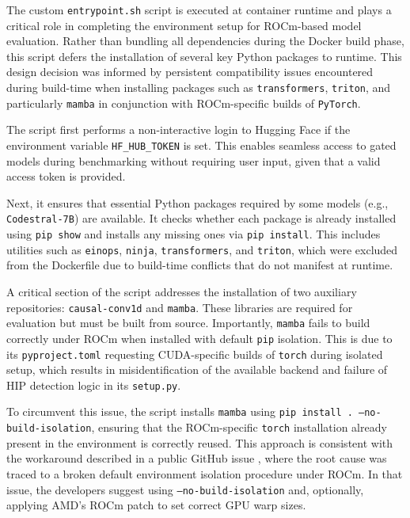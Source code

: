The custom \texttt{entrypoint.sh} script is executed at container runtime and plays a critical role in completing the environment setup for ROCm-based model evaluation. Rather than bundling all dependencies during the Docker build phase, this script defers the installation of several key Python packages to runtime. This design decision was informed by persistent compatibility issues encountered during build-time when installing packages such as \texttt{transformers}, \texttt{triton}, and particularly \texttt{mamba} in conjunction with ROCm-specific builds of \texttt{PyTorch}.

The script first performs a non-interactive login to Hugging Face if the environment variable \texttt{HF\_HUB\_TOKEN} is set. This enables seamless access to gated models during benchmarking without requiring user input, given that a valid access token is provided.

Next, it ensures that essential Python packages required by some models (e.g., \texttt{Codestral-7B}) are available. It checks whether each package is already installed using \texttt{pip show} and installs any missing ones via \texttt{pip install}. This includes utilities such as \texttt{einops}, \texttt{ninja}, \texttt{transformers}, and \texttt{triton}, which were excluded from the Dockerfile due to build-time conflicts that do not manifest at runtime.

A critical section of the script addresses the installation of two auxiliary repositories: \texttt{causal-conv1d} and \texttt{mamba}. These libraries are required for evaluation but must be built from source. Importantly, \texttt{mamba} fails to build correctly under ROCm when installed with default \texttt{pip} isolation. This is due to its \texttt{pyproject.toml} requesting CUDA-specific builds of \texttt{torch} during isolated setup, which results in misidentification of the available backend and failure of HIP detection logic in its \texttt{setup.py}.

To circumvent this issue, the script installs \texttt{mamba} using \texttt{pip install . --no-build-isolation}, ensuring that the ROCm-specific \texttt{torch} installation already present in the environment is correctly reused. This approach is consistent with the workaround described in a public GitHub issue \autocite{mamba_rocm_conflict}, where the root cause was traced to a broken default environment isolation procedure under ROCm. In that issue, the developers suggest using \texttt{--no-build-isolation} and, optionally, applying AMD's ROCm patch \autocite{rocm_patch_405} to set correct GPU warp sizes.

